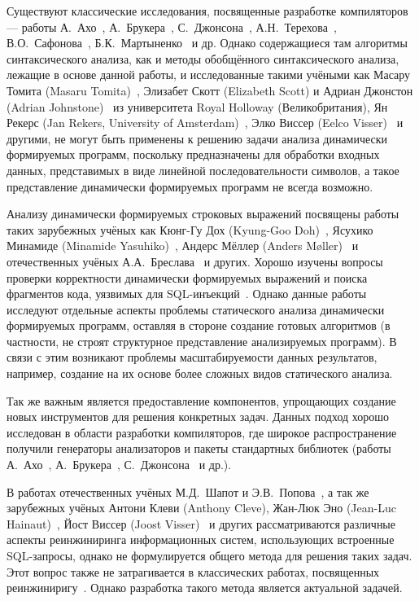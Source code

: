 Существуют классические исследования, посвященные разработке компиляторов --- работы А.~Ахо~\cite{Dragon}, А.~Брукера~\cite{CompilerCompiler}, С.~Джонсона~\cite{yaccBook},  А.Н.~Терехова~\cite{ANTCompiler}, В.О.~Сафонова~\cite{safonov}, Б.К.~Мартыненко~\cite{Martinenko1, Martinenko2}  и др.  Однако содержащиеся там алгоритмы синтаксического анализа, как и методы обобщённого синтаксического анализа, лежащие в основе данной работы, и исследованные такими учёными как Масару Томита (Masaru Tomita)~\cite{Tomita}, Элизабет Скотт (Elizabeth Scott) и Адриан Джонстон (Adrian Johnstone)~\cite{RNGLR,RIGLR} из университета Royal Holloway (Великобритания), Ян Рекерс (Jan Rekers, University of Amsterdam)~\cite{SPPF}, Элко Виссер (Eelco Visser)~\cite{RNGLRSyntaxerror2,RNGLRSyntaxerror3} и другими, не могут быть применены к решению задачи анализа динамически формируемых программ, поскольку предназначены для обработки входных данных, представимых в виде линейной последовательности символов, а такое представление динамически формируемых программ не всегда возможно.

Анализу динамически формируемых строковых выражений посвящены работы таких зарубежных учёных как Кюнг-Гу Дох (Kyung-Goo Doh)~\cite{LrAbstract1,LrAbstract2,LRAbstractParsingSema}, Ясухико Минамиде (Minamide Yasuhiko)~\cite{PHPSA}, Андерс Мёллер (Anders M{\o}ller)~\cite{JSA} и отечественных учёных А.А.~Бреслава~\cite{Alvor1,Alvor2} и других. Хорошо изучены вопросы проверки корректности динамически формируемых выражений и поиска фрагментов кода, уязвимых для SQL-инъекций~\cite{SQLInjection,Dasgupta:2009:SAF:1546683.1547548}. Однако данные работы исследуют отдельные аспекты проблемы статического анализа динамически формируемых программ, оставляя в стороне создание готовых алгоритмов (в частности, не строят структурное представление анализируемых программ). В связи с этим возникают проблемы масштабируемости данных результатов, например, создание на их основе более сложных видов статического анализа.

Так же важным является предоставление компонентов, упрощающих создание новых инструментов для решения конкретных задач. Данных подход хорошо исследован в области разработки компиляторов, где широкое распространение получили генераторы анализаторов и пакеты стандартных библиотек (работы А.~Ахо~\cite{Dragon}, А.~Брукера~\cite{CompilerCompiler}, С.~Джонсона~\cite{yaccBook} и др.). 

В работах отечественных учёных М.Д.~Шапот и Э.В.~Попова~\cite{DynamicDSQLTranslation}, а так же зарубежных учёных Антони Клеви (Anthony Cleve), Жан-Люк Эно (Jean-Luc Hainaut)~\cite{DSQLReverseEngineering}, Йост Виссер (Joost Visser)~\cite{DSQLQualityMesure} и других рассматриваются различные аспекты реинжиниринга информационных систем, использующих встроенные SQL-запросы, однако не формулируется общего метода для решения таких задач. Этот вопрос также не затрагивается в классических работах, посвященных реинжиниригу~\cite{SoftwareReeng1, reengANT, SoftwareReeng2, SoftwareReeng3}. Однако разработка такого метода является актуальной задачей.

